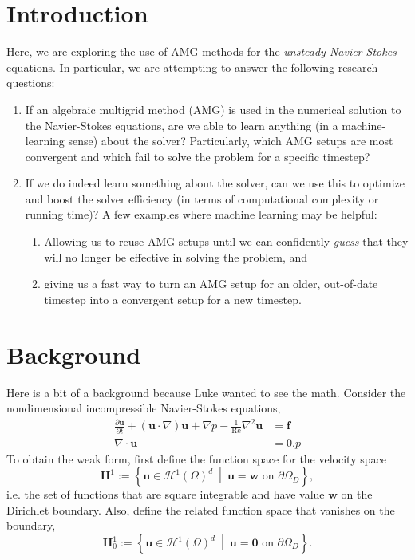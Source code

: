 \documentclass{article}
\newcommand{\mat}[1]{\bm{{#1}}}
\renewcommand{\vec}[1]{\bm{{#1}}}
\newcommand{\grad}{\nabla}
\newcommand{\setbar}{\:\middle|\:}
\renewcommand{\div}{\grad \cdot}
\renewcommand{\Re}{\text{Re}}
\begin{document}
\section{Introduction}
Here, we are exploring the use of AMG methods for the \textit{unsteady Navier-Stokes} equations.  In particular, we are attempting to answer the following research questions:
\begin{enumerate}
\item If an algebraic multigrid method (AMG) is used in the numerical solution to the Navier-Stokes equations, are we able to learn anything (in a machine-learning sense) about the solver?  Particularly, which AMG setups are most convergent and which fail to solve the problem for a specific timestep?
\item If we do indeed learn something about the solver, can we use this to optimize and boost the solver efficiency (in terms of computational complexity or running time)?  A few examples where machine learning may be helpful:
  \begin{enumerate}
  \item Allowing us to reuse AMG setups until we can confidently \textit{guess} that they will no longer be effective in solving the problem, and
  \item giving us a fast way to turn an AMG setup for an older, out-of-date timestep into a convergent setup for a new timestep.
  \end{enumerate}
\end{enumerate}

\section{Background}
Here is a bit of a background because Luke wanted to see the math.  Consider the nondimensional incompressible Navier-Stokes equations,
\begin{align}
  \frac{\partial \vec{u}}{\partial t} + \left(\vec{u} \cdot \grad\right)\vec{u} + \grad p - \frac{1}{\Re} \grad^2\vec{u} &= \vec{f} \label{eqn:nsmomentum} \\
  \div \vec{u} &= 0. \label{eqn:nsdiv}
p\end{align}
To obtain the weak form, first define the function space for the velocity space
\begin{equation}
  \mat{H}^1 := \left\{ \vec{u} \in \mathcal{H}^{1}\left(\Omega\right)^d \setbar \vec{u} = \vec{w} \text{ on } \partial \Omega_D \right\}, \label{eqn:h1}
\end{equation}
i.e. the set of functions that are square integrable and have value $\vec{w}$ on the Dirichlet boundary.  Also, define the related function space that vanishes on the boundary,
\begin{equation}
  \mat{H}^1_0 := \left\{ \vec{u} \in \mathcal{H}^{1}\left(\Omega\right)^d \setbar \vec{u} = \vec{0} \text{ on } \partial \Omega_D \right\}. \label{eqn:h10}
\end{equation}
\end{document}
